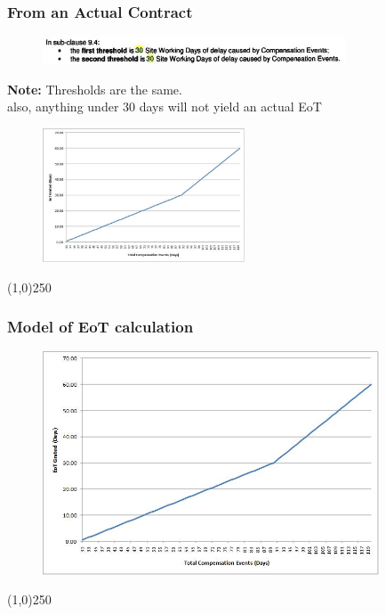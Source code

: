 \begin{frame}
\frametitle{From an Actual Contract}
\begin{figure}
	\centering
		\includegraphics[width = 9cm]{images/cl94.jpg}
	\label{fig:cl94}
\end{figure}
\textbf{Note:} Thresholds are the same.\\
also, anything under 30 days will not yield an actual EoT
\begin{figure}
 	\centering
 		\includegraphics[width = 6cm]{images/cl94grf.jpg}
 	\label{fig:cl94grf}
 \end{figure}
\end{frame}
\begin{center}\line(1,0){250}\end{center}






\begin{frame}
\frametitle{Model of EoT calculation}
\begin{figure}
	\centering
		\includegraphics[width = 10cm]{images/cl94grf.jpg}
	\label{fig:cl94grf:dup}
\end{figure}
\end{frame}
\begin{center}\line(1,0){250}\end{center}



